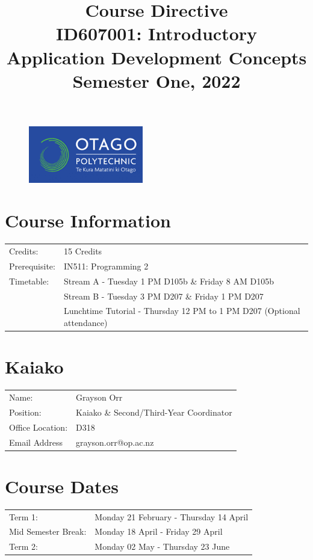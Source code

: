 \documentclass{article}
\author{}
\begin{document}
\begin{figure}
	\includegraphics[width=50mm]{../img/logo.png}
\end{figure}

\title{Course Directive\\ID607001: Introductory Application Development Concepts\\Semester One, 2022}
\date{}
\maketitle

\section*{Course Information}
\begin{tabular}{ll}
	Credits:      & 15 Credits                                                             \\
	Prerequisite: & IN511: Programming 2                                                   \\
	Timetable:    & Stream A - Tuesday 1 PM D105b \& Friday 8 AM D105b                     \\
	              & Stream B - Tuesday 3 PM D207 \& Friday 1 PM D207                       \\
	              & Lunchtime Tutorial - Thursday 12 PM to 1 PM D207 (Optional attendance)
\end{tabular}

\section*{Kaiako}
\begin{tabular}{ll}
	Name:            & Grayson Orr                             \\
	Position:        & Kaiako \& Second/Third-Year Coordinator \\
	Office Location: & D318                                    \\
	Email Address    & grayson.orr@op.ac.nz                    \\
\end{tabular}

\section*{Course Dates}
\begin{tabular}{ll}
	Term 1:             & Monday 21 February - Thursday 14 April \\
	Mid Semester Break: & Monday 18 April - Friday 29 April      \\
	Term 2:             & Monday 02 May - Thursday 23 June       \\
\end{tabular}
\end{document}
